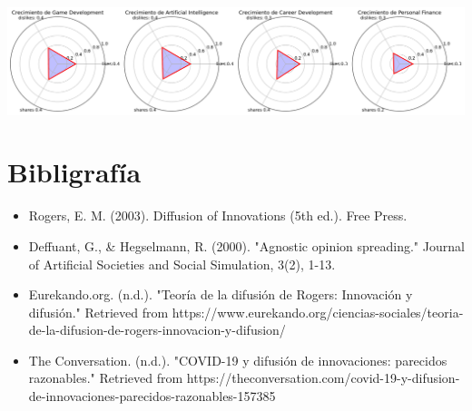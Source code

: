 \documentclass[acmtog]{acmart}
\begin{document}
\vspace{0.5cm}
\includegraphics[scale=0.17]{an_1-metrics-by-topic.png}
\section{Bibligrafía}
\begin{itemize}
	\item Rogers, E. M. (2003). Diffusion of Innovations (5th ed.). Free Press.
	\item Deffuant, G., \& Hegselmann, R. (2000). "Agnostic opinion spreading." Journal of Artificial Societies and Social Simulation, 3(2), 1-13.
	\item Eurekando.org. (n.d.). "Teoría de la difusión de Rogers: Innovación y difusión." Retrieved from https://www.eurekando.org/ciencias-sociales/teoria-de-la-difusion-de-rogers-innovacion-y-difusion/
	\item The Conversation. (n.d.). "COVID-19 y difusión de innovaciones: parecidos razonables." Retrieved from https://theconversation.com/covid-19-y-difusion-de-innovaciones-parecidos-razonables-157385
\end{itemize}
\end{document}

